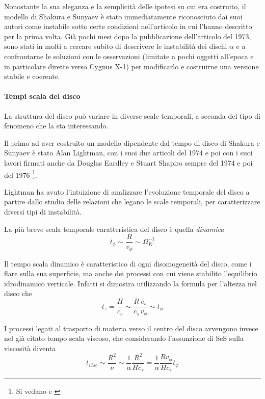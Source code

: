 \documentclass[a4paperbi]{article}
\begin{document}
	Nonostante la sua eleganza e la semplicità delle ipotesi su cui era costruito, il modello di Shakura e Sunyaev è stato immediatamente riconosciuto dai suoi autori come instabile sotto certe condizioni nell'articolo in cui l'hanno descritto per la prima volta. Già pochi mesi dopo la pubblicazione dell'articolo del 1973, sono stati in molti a cercare subito di descrivere le instabilità dei dischi $\alpha$ e a confrontarne le soluzioni con le osservazioni (limitate a pochi oggetti all'epoca e in particolare dirette verso Cygnus X-1) per modificarlo e costruirne una versione stabile e coerente.
	
	\paragraph{Tempi scala del disco}	

	La struttura del disco può variare in diverse scale temporali, a seconda del tipo di fenomeno che la sta interessando. 	
	
	Il primo ad aver costruito un modello dipendente dal tempo di disco di Shakura e Sunyaev è stato Alan Lightman, con i suoi due articoli del 1974 e poi con i suoi lavori firmati anche da Douglas Eardley e Stuart Shapiro sempre del 1974 e poi del 1976 \footnote{Si vedano \cite{LightmanEardley1974} e \cite{ShapiroLightmanEardley1976}}. 
	
	Lightman ha avuto l'intuizione di analizzare l'evoluzione temporale del disco a partire dallo studio delle relazioni che legano le scale temporali, per caratterizzare diversi tipi di instabilità.	
	
	La più breve scala temporale caratteristica del disco è quella \textit{dinamica}
	\begin{equation}
		t_\phi\sim\frac{R}{v_\phi}\sim\Omega_K^{-1}
	\end{equation}

	Il tempo scala dinamico è caratteristico di ogni disomogeneità del disco, come i flare sulla sua superficie, ma anche dei processi con cui viene stabilito l'equilibrio idrodinamico verticale. Infatti si dimostra utilizzando la formula per l'altezza nel disco che
	\begin{equation}
		t_z=\frac{H}{c_s}\sim \frac{R}{c_s}\frac{c_s}{v_\phi}\sim t_\phi
	\end{equation}
	
	I processi legati al trasporto di materia verso il centro del disco avvengono invece nel già citato tempo scala viscoso, che considerando l'assunzione di SeS sulla viscosità diventa
	\begin{equation}
		t_{visc}\sim\frac{R^2}{\nu}\sim\frac{1}{\alpha}\frac{R^2}{Hc_s}=\frac{1}{\alpha}\frac{Rv_\phi}{Hc_s}t_\phi
	\end{equation}
\end{document}
